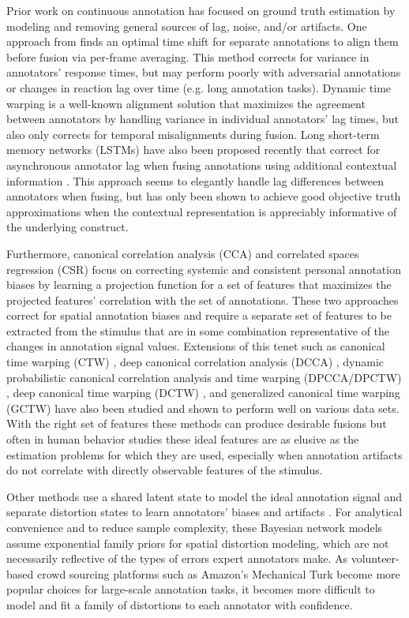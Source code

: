 \documentclass[times,twocolumn,final,authoryear]{elsarticle}
\begin{document}
Prior work on continuous annotation has focused on ground truth estimation by modeling and removing general sources of lag, noise, and/or artifacts.  One approach from \cite{Mariooryad2015} finds an optimal time shift for separate annotations to align them before fusion via per-frame averaging.  This method corrects for variance in annotators' response times, but may perform poorly with adversarial annotations or changes in reaction lag over time (e.g. long annotation tasks).  Dynamic time warping \citep{DTW2007} is a well-known alignment solution that maximizes the agreement between annotators by handling variance in individual annotators' lag times, but also only corrects for temporal misalignments during fusion.  Long short-term memory networks (LSTMs) have also been proposed recently that correct for asynchronous annotator lag when fusing annotations using additional contextual information \citep{Ringeval2015}.  This approach seems to elegantly handle lag differences between annotators when fusing, but has only been shown to achieve good objective truth approximations when the contextual representation is appreciably informative of the underlying construct.

Furthermore, canonical correlation analysis (CCA) \citep{CCA1936} and correlated spaces regression (CSR) \citep{nicolaou2013correlated} focus on correcting systemic and consistent personal annotation biases by learning a projection function for a set of features that maximizes the projected features' correlation with the set of annotations.  These two approaches correct for spatial annotation biases and require a separate set of features to be extracted from the stimulus that are in some combination representative of the changes in annotation signal values.  Extensions of this tenet such as canonical time warping (CTW) \citep{CTW2009}, deep canonical correlation analysis (DCCA) \citep{andrew2013deep}, dynamic probabilistic canonical correlation analysis and time warping (DPCCA/DPCTW) \citep{nicolaou2014dynamic}, deep canonical time warping (DCTW) \citep{trigeorgis2016deep}, and generalized canonical time warping (GCTW) \citep{Zhou2016} have also been studied and shown to perform well on various data sets.  With the right set of features these methods can produce desirable fusions but often in human behavior studies these ideal features are as elusive as the estimation problems for which they are used, especially when annotation artifacts do not correlate with directly observable features of the stimulus.

Other methods use a shared latent state to model the ideal annotation signal and separate distortion states to learn annotators' biases and artifacts \citep{audhkhasi2013globally, zhu2015fusing, Gupta2016}.  For analytical convenience and to reduce sample complexity, these Bayesian network models assume exponential family priors for spatial distortion modeling, which are not necessarily reflective of the types of errors expert annotators make.  As volunteer-based crowd sourcing platforms such as Amazon's Mechanical Turk become more popular choices for large-scale annotation tasks, it becomes more difficult to model and fit a family of distortions to each annotator with confidence.
\end{document}
